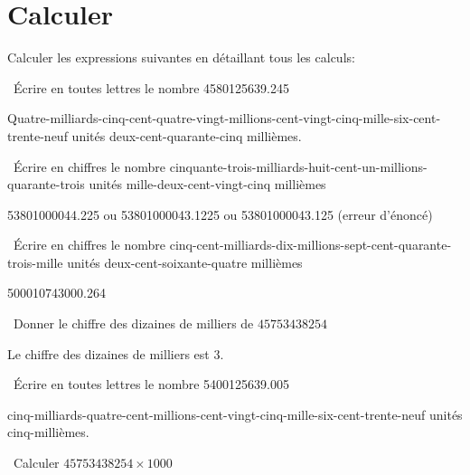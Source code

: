 	
	\section{Calculer}
	Calculer les expressions suivantes en détaillant tous les calculs:
	\begin{questions}
		
	
		\question[1]  \'Ecrire en toutes lettres le nombre \num{4580125639.245}
		
		
		\begin{solution}
			Quatre-milliards-cinq-cent-quatre-vingt-millions-cent-vingt-cinq-mille-six-cent-trente-neuf unités deux-cent-quarante-cinq millièmes.
		\end{solution}	 
		
		\question[1]  \'Ecrire en chiffres le nombre cinquante-trois-milliards-huit-cent-un-millions-quarante-trois unités mille-deux-cent-vingt-cinq millièmes
		
		\begin{solution}
			\num{53801000044,225} ou \num{53801000043,1225} ou \num{53801000043,125} (erreur d'énoncé)
		\end{solution}
			
		
		\question[1]  \'Ecrire en chiffres le nombre cinq-cent-milliards-dix-millions-sept-cent-quarante-trois-mille unités deux-cent-soixante-quatre millièmes
		
		\begin{solution}
			\num{500010743000.264}
		\end{solution}
		
		\question[1]  Donner le chiffre des dizaines de milliers de $\num{45753438254}$
		
		\begin{solution}
			Le chiffre des dizaines de milliers est 3.
		\end{solution}
		
		\question[1]  \'Ecrire en toutes lettres le nombre \num{5400125639.005}
		
		\begin{solution}
			cinq-milliards-quatre-cent-millions-cent-vingt-cinq-mille-six-cent-trente-neuf unités cinq-millièmes.
		\end{solution}
		\newpage
		
		\question[1]  Calculer $\num{45753438254} \times 1000$
		

\end{questions}
